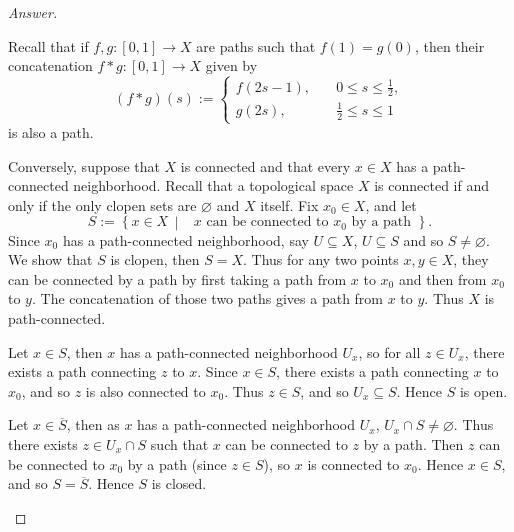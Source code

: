 \documentclass[12pt]{article}
\newcommand\setb[1]{\left \{ #1 \right \}}
\theoremstyle{definition}
\begin{document}
\begin{proof}[Answer]
\begin{enumerate}[(a)]
        Recall that if $f , g : [0,1] \to X$ are paths such that $f(1) = g(0)$, then their concatenation $f \ast g : [0,1] \to X$ given by 
        \[
            (f \ast g)(s) := 
            \begin{cases}
                f(2s-1) , & \quad 0 \leq s \leq \frac{1}{2}, \\
                g(2s) , & \quad \frac{1}{2} \leq s \leq 1
            \end{cases}
        \]
        is also a path.
        
        Conversely, suppose that $X$ is connected and that every $x \in X$ has a path-connected neighborhood. Recall that a topological space $X$ is connected if and only if the only clopen sets are $\varnothing$ and $X$ itself. Fix $x_0 \in X$, and let 
        \[
            S := \setb{ x \in X \, \middle| \, \text{ $x$ can be connected to $x_0$ by a path } }.
        \]
        Since $x_0$ has a path-connected neighborhood, say $U \subseteq X$, $U \subseteq S$ and so $S \neq \varnothing$. We show that $S$ is clopen, then $S = X$. Thus for any two points $x, y \in X$, they can be connected by a path by first taking a path from $x$ to $x_0$ and then from $x_0$ to $y$. The concatenation of those two paths gives a path from $x$ to $y$. Thus $X$ is path-connected.
        
        Let $x \in S$, then $x$ has a path-connected neighborhood $U_x$, so for all $z \in U_x$, there exists a path connecting $z$ to $x$. Since $x \in S$, there exists a path connecting $x$ to $x_0$, and so $z$ is also connected to $x_0$. Thus $z \in S$, and so $U_x \subseteq S$. Hence $S$ is open.
        
        Let $x \in \overline{S}$, then as $x$ has a path-connected neighborhood $U_x$, $U_x \cap S \neq \varnothing$. Thus there exists $z \in U_x \cap S$ such that $x$ can be connected to $z$ by a path. Then $z$ can be connected to $x_0$ by a path (since $z \in S$), so $x$ is connected to $x_0$. Hence $x \in S$, and so $S = \overline{S}$. Hence $S$ is closed. 
    \end{enumerate}
\end{proof}
\end{document}
